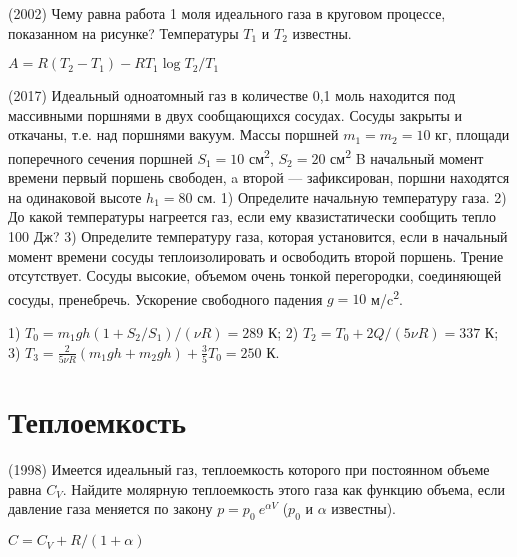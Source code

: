 \begin{ex}
(2002) Чему равна работа 1 моля идеального газа в круговом процессе, показанном на рисунке? Температуры $T_1$ и $T_2$ известны.
\begin{center}

\end{center}
\begin{ans}
$A= R(T_2-T_1)-RT_1 \log T_2/T_1$
\end{ans}
\end{ex}

\begin{ex}
(2017) Идеальный одноатомный газ в количестве 0,1 моль находится под массивными поршнями в двух сообщающихся сосудах. Сосуды закрыты и откачаны, т.е. над поршнями вакуум. Массы поршней $m_1 = m_2 = 10$ кг, площади поперечного сечения поршней $S_1 = 10$ см\textsuperscript{2}, $S_2 = 20$ см\textsuperscript{2} B начальный момент времени первый поршень свободен, a второй — зафиксирован, поршни находятся на одинаковой высоте $h_1 = 80$ см. 1) Определите начальную температуру газа. 2) До какой температуры нагреется газ, если ему квазистатически сообщить тепло 100 Дж? 3) Определите температуру газа, которая установится, если в начальный момент времени сосуды теплоизолировать и освободить второй поршень. Трение отсутствует. Сосуды высокие, объемом очень тонкой перегородки, соединяющей сосуды, пренебречь. Ускорение свободного падения $g = 10$ м/c\textsuperscript{2}.
\begin{center}

\end{center}
\begin{ans}
1) $T_0 = m_1gh(1+S_2/S_1)/(\nu R) = 289$ К;
2) $T_2 = T_0 + 2Q/(5\nu R) = 337$ К; 
3) $T_3 = \frac{2}{5\nu R}(m_1 gh + m_2 gh)+ \frac{3}{5}T_0 = 250$ К.
\end{ans}
\end{ex}

\section{Теплоемкость}

\begin{ex}
(1998) Имеется идеальный газ, теплоемкость которого при постоянном объеме равна $C_V$. 
Найдите молярную теплоемкость этого газа как функцию объема, если давление газа меняется по закону $p=p_0~e^{\alpha V}$ ($p_0$ и $\alpha$ известны).
\begin{ans}
$C = C_V + R/(1+\alpha)$
\end{ans}
\end{ex}

